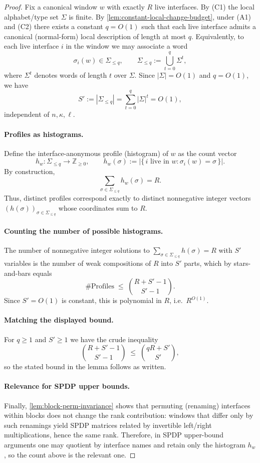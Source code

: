 \documentclass[12pt]{article}
\theoremstyle{definition}
\theoremstyle{remark}
\begin{document}
\begin{proof}
Fix a canonical window $w$ with exactly $R$ live interfaces. By (C1) the local
alphabet/type set $\Sigma$ is finite. By \ref{lem:constant-local-change-budget},
under (A1) and (C2) there exists a constant $q=O(1)$ such that each live interface
admits a canonical (normal-form) local description of length at most $q$.
Equivalently, to each live interface $i$ in the window we may associate a word
\[
\sigma_i(w)\in \Sigma_{\le q},
\qquad
\Sigma_{\le q}:=\bigcup_{t=0}^q \Sigma^t,
\]
where $\Sigma^t$ denotes words of length $t$ over $\Sigma$.
Since $|\Sigma|=O(1)$ and $q=O(1)$, we have
\[
S' := |\Sigma_{\le q}|
= \sum_{t=0}^q |\Sigma|^t
= O(1),
\]
independent of $n,\kappa,\ell$.

\paragraph{Profiles as histograms.}
Define the interface-anonymous profile (histogram) of $w$ as the count vector
\[
h_w:\Sigma_{\le q}\to \mathbb{Z}_{\ge 0},
\qquad
h_w(\sigma):=\bigl|\{\, i \text{ live in } w : \sigma_i(w)=\sigma \,\}\bigr|.
\]
By construction,
\[
\sum_{\sigma\in \Sigma_{\le q}} h_w(\sigma) = R.
\]
Thus, distinct profiles correspond exactly to distinct nonnegative integer vectors
$(h(\sigma))_{\sigma\in\Sigma_{\le q}}$ whose coordinates sum to $R$.

\paragraph{Counting the number of possible histograms.}
The number of nonnegative integer solutions to
$\sum_{\sigma\in\Sigma_{\le q}} h(\sigma)=R$ with $S'$ variables is the number of
weak compositions of $R$ into $S'$ parts, which by stars-and-bars equals
\[
\#\mathrm{Profiles}
\;\le\;
\binom{R+S'-1}{S'-1}.
\]
Since $S'=O(1)$ is constant, this is polynomial in $R$, i.e.\ $R^{O(1)}$.

\paragraph{Matching the displayed bound.}
For $q\ge 1$ and $S'\ge 1$ we have the crude inequality
\[
\binom{R+S'-1}{S'-1}
\;\le\;
\binom{qR+S'}{S'},
\]
so the stated bound in the lemma follows as written.

\paragraph{Relevance for SPDP upper bounds.}
Finally, \ref{lem:block-perm-invariance} shows that permuting (renaming)
interfaces within blocks does not change the rank contribution: windows that differ
only by such renamings yield SPDP matrices related by invertible left/right
multiplications, hence the same rank. Therefore, in SPDP upper-bound arguments
one may quotient by interface names and retain only the histogram $h_w$, so the
count above is the relevant one.


\end{proof}
\end{document}
